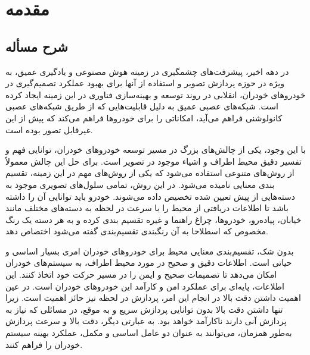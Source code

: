 \chapter{مقدمه}

\section{شرح مسأله}
در دهه اخیر، پیشرفت‌های چشمگیری در زمینه هوش مصنوعی و یادگیری عمیق، به ویژه در حوزه پردازش تصویر و استفاده از آنها برای بهبود عملکرد تصمیم‌گیری در خودروهای خودران، انقلابی در روند توسعه و بهینه‌سازی فناوری در این زمینه ایجاد کرده است. شبکه‌های عصبی عمیق
به دلیل قابلیت‌هایی که از طریق شبکه‌های عصبی کانولوشنی
\cite{o2015introduction}
فراهم می‌آید، امکاناتی را برای خودروها فراهم می‌کند که پیش از این غیرقابل تصور بوده است.

با این وجود، یکی از چالش‌های بزرگ در مسیر توسعه خودروهای خودران، توانایی فهم و تفسیر دقیق محیط اطراف و اشیاء موجود در تصویر است. برای حل این چالش معمولاً از روش‌های متنوعی استفاده می‌شود که یکی از روش‌های مهم در این زمینه، تقسیم بندی معنایی نامیده می‌شود. در این روش، تمامی سلول‌‌های
تصویری موجود به دسته‌هایی از پیش تعیین شده تخصیص داده می‌شوند. خودرو باید توانایی آن را داشته باشد تا اطلاعات دریافتی از محیط را با سرعت در لحظه
به دسته‌های مختلف مانند خیابان، پیاده‌رو، خودروها، چراغ راهنما و غیره تقسیم بندی کرده و به هر دسته یک رنگ مخصوص که اسطلاحا به آن رنگبندی تقسیم‌بندی
گفته می‌شود اختصاص دهد.

بدون شک، تقسیم‌بندی معنایی محیط برای خودروهای خودران امری بسیار اساسی و حیاتی است. اطلاعات دقیق و صحیح در مورد محیط اطراف، به سیستم‌های خودران امکان می‌دهد تا تصمیمات صحیح و ایمن را در مسیر حرکت خود اتخاذ کنند. این اطلاعات، پایه‌ای برای عملکرد امن و کارآمد این خودروهای خودران است. در عین اهمیت داشتن دقت بالا در انجام این امر، پردازش در لحظه نیز حائز اهمیت است. زیرا تنها داشتن دقت بالا بدون توانایی پردازش سریع و به موقع، در مسائلی که نیاز به پردازش آنی دارند ناکارآمد خواهد بود. به عبارتی دیگر، دقت بالا و سرعت پردازش به‌طور همزمان، می‌توانند به عنوان دو عامل اساسی و مکمل، عملکرد بهینه سیستم خودران را فراهم کنند.

